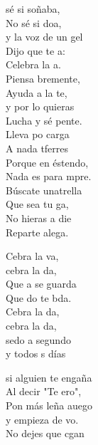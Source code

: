 \begin{cancion}%
	 sé si soñaba,\\
	No sé si doa,\\
	y la voz de un gel\\
	Dijo que te a:\\
	Celebra la a.    \\
	Piensa bremente,\\
	Ayuda a la te,\\
	y por lo  quieras\\
	Lucha y sé pente.\\
	Lleva po carga\\
	A nada tferres\\
	Porque en éstendo,\\
	Nada es para mpre.\\
	Búscate unatrella\\
	Que sea tu ga,\\
	No hieras a die\\
	Reparte alega.\jump\\
	\begin{chorus}%
		Cebra la va, \\
		cebra la da,\\
		Que a se guarda\\
		Que do te bda.\\
	\jump
		Cebra la da, \\
		cebra la da,\\
		sedo a segundo \\
		y todos s días \jump\\
	\end{chorus}%
	si alguien te engaña\\
	Al decir "Te ero",\\
	Pon más leña auego\\
	y empieza de vo.\\
	No dejes que cgan\\

\end{cancion}
